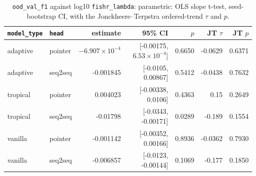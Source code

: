 \documentclass[10pt]{article}
\begin{document}
{\small
\begin{longtable}{llrrrrr}
\caption{\texttt{ood\_val\_f1} against log10 \texttt{fishr\_lambda}: parametric: OLS slope t-test, seed-bootstrap CI, with the Jonckheere--Terpstra ordered-trend $\tau$ and $p$.}\label{tab:trend-ood_val_f1}\\
\toprule
\texttt{model\_type} & \texttt{head} & estimate & 95\% CI & $p$ & JT $\tau$ & JT $p$\\
\midrule
\endhead
adaptive & pointer & $-6.907\times10^{-4}$ & [-0.00175, $6.53\times10^{-4}$] & 0.6650 & -0.0629 & 0.6371\\
adaptive & seq2seq & -0.001845 & [-0.0105, 0.00867] & 0.5412 & -0.0438 & 0.7632\\
tropical & pointer & 0.004023 & [-0.00338, 0.0106] & 0.4363 & 0.15 & 0.2649\\
tropical & seq2seq & -0.01798 & [-0.0343, -0.00171] & 0.0289 & -0.189 & 0.1554\\
vanilla & pointer & -0.001142 & [-0.00352, 0.00166] & 0.8936 & -0.0362 & 0.7930\\
vanilla & seq2seq & -0.006857 & [-0.0123, -0.00144] & 0.1069 & -0.177 & 0.1850\\
\bottomrule
\end{longtable}
}
\end{document}
